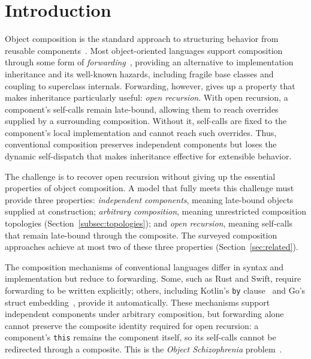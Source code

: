 \documentclass[acmsmall,screen,review,anonymous]{acmart}
\theoremstyle{acmplain}
\newcommand{\code}[1]{\texttt{#1}}
\begin{document}

\maketitle

\section{Introduction}
\label{sec:intro}

Object composition is the standard approach to structuring behavior from reusable components~\cite{gamma1994}. Most
object-oriented languages support composition through some form of \emph{forwarding}~\cite{kniesel2000}, providing an
alternative to implementation inheritance and its well-known hazards, including fragile base classes and coupling to
superclass internals. Forwarding, however, gives up a property that makes inheritance particularly useful:
\emph{open recursion}. With open recursion, a component's self-calls remain late-bound, allowing them to reach
overrides supplied by a surrounding composition. Without it, self-calls are fixed to the component's local
implementation and cannot reach such overrides. Thus, conventional composition preserves independent components but
loses the dynamic self-dispatch that makes inheritance effective for extensible behavior.

The challenge is to recover open recursion without giving up the essential properties of object composition. A model
that fully meets this challenge must provide three properties: \emph{independent components}, meaning late-bound objects
supplied at construction; \emph{arbitrary composition}, meaning unrestricted composition topologies (Section~\ref{subsec:topologies}); and
\emph{open recursion}, meaning self-calls that remain late-bound through the composite. The surveyed composition
approaches achieve at most two of these three properties (Section~\ref{sec:related}).

The composition mechanisms of conventional languages differ in syntax and implementation but reduce to forwarding.
Some, such as Rust and Swift, require forwarding to be written explicitly; others, including Kotlin's \code{by}
clause~\cite{kotlin} and Go's struct embedding~\cite{go}, provide it automatically. These mechanisms support independent
components under arbitrary composition, but forwarding alone cannot preserve the composite identity required for open
recursion: a component's \code{this} remains the component itself, so its self-calls cannot be redirected through a
composite. This is the \emph{Object Schizophrenia} problem~\cite{sekharaiah2002,kniesel2000}.
\end{document}
